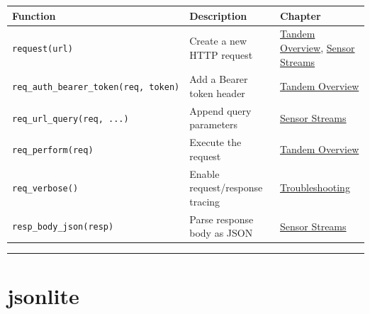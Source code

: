 \documentclass[
  11pt,
  letterpaper,
  DIV=11,
  numbers=noendperiod]{scrreprt}
\begin{document}
\begin{longtable}[]{@{}
  >{\raggedright\arraybackslash}p{}
  >{\raggedright\arraybackslash}p{}
  >{\raggedright\arraybackslash}p{}@{}}
\toprule\noalign{}
\begin{minipage}[b]{\linewidth}\raggedright
Function
\end{minipage} & \begin{minipage}[b]{\linewidth}\raggedright
Description
\end{minipage} & \begin{minipage}[b]{\linewidth}\raggedright
Chapter
\end{minipage} \\
\midrule\noalign{}
\endhead
\bottomrule\noalign{}
\endlastfoot
\texttt{request(url)} & Create a new HTTP request &
\hyperref[autodesk-tandem-overview]{Tandem Overview},
\hyperref[linking-sensor-streams]{Sensor Streams} \\
\texttt{req\_auth\_bearer\_token(req,\ token)} & Add a Bearer token
header & \hyperref[autodesk-tandem-overview]{Tandem Overview} \\
\texttt{req\_url\_query(req,\ ...)} & Append query parameters &
\hyperref[linking-sensor-streams]{Sensor Streams} \\
\texttt{req\_perform(req)} & Execute the request &
\hyperref[autodesk-tandem-overview]{Tandem Overview} \\
\texttt{req\_verbose()} & Enable request/response tracing &
\href{troubleshooting.qmd}{Troubleshooting} \\
\texttt{resp\_body\_json(resp)} & Parse response body as JSON &
\hyperref[linking-sensor-streams]{Sensor Streams} \\
\end{longtable}

\begin{center}\rule{0.5\linewidth}{0.5pt}\end{center}

\section{jsonlite}\label{jsonlite}
\end{document}
